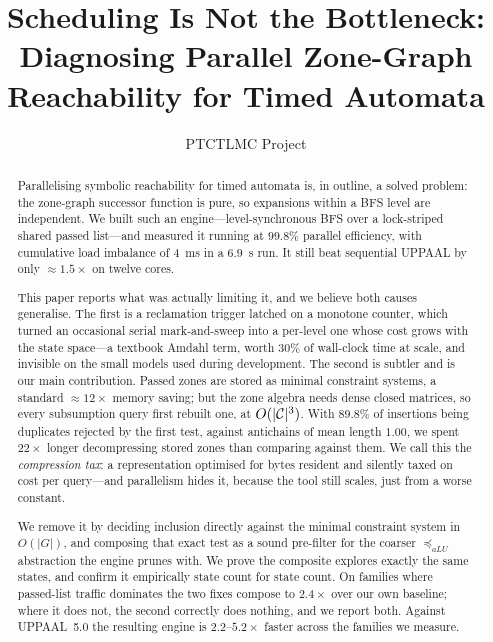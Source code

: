 \documentclass[runningheads]{llncs}
\title{Scheduling Is Not the Bottleneck:\\
  Diagnosing Parallel Zone-Graph Reachability for Timed Automata}
\author{PTCTLMC Project}
\institute{Anonymous Submission}
\begin{document}
\maketitle

\begin{abstract}
Parallelising symbolic reachability for timed automata is, in outline, a solved
problem: the zone-graph successor function is pure, so expansions within a BFS
level are independent.  We built such an engine---level-synchronous BFS over a
lock-striped shared passed list---and measured it running at $99.8\%$ parallel
efficiency, with cumulative load imbalance of $4$~ms in a $6.9$~s run.  It still
beat sequential UPPAAL by only $\approx 1.5\times$ on twelve cores.

This paper reports what was actually limiting it, and we believe both causes
generalise.  The first is a reclamation trigger latched on a monotone counter,
which turned an occasional serial mark-and-sweep into a per-level one whose cost
grows with the state space---a textbook Amdahl term, worth $30\%$ of wall-clock
time at scale, and invisible on the small models used during development.  The
second is subtler and is our main contribution.  Passed zones are stored as
minimal constraint systems, a standard $\approx 12\times$ memory saving; but the
zone algebra needs dense closed matrices, so every subsumption query first
rebuilt one, at $O(|\mathcal{C}|^3)$.  With $89.8\%$ of insertions being duplicates
rejected by the first test, against antichains of mean length $1.00$, we spent
$22\times$ longer decompressing stored zones than comparing against them.  We
call this the \emph{compression tax}: a representation optimised for bytes
resident and silently taxed on cost per query---and parallelism hides it, because
the tool still scales, just from a worse constant.

We remove it by deciding inclusion directly against the minimal constraint
system in $O(|G|)$, and composing that exact test as a sound pre-filter for the
coarser $\preceq_{aLU}$ abstraction the engine prunes with.  We prove the
composite explores exactly the same states, and confirm it empirically state
count for state count.  On families where passed-list traffic dominates the two
fixes compose to $2.4\times$ over our own baseline; where it does not, the
second correctly does nothing, and we report both.  Against UPPAAL~5.0 the
resulting engine is $2.2$--$5.2\times$ faster across the families we measure.
\end{abstract}
\end{document}
